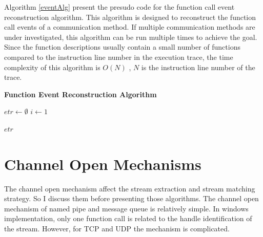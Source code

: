 Algorithm \ref{eventAlg} present the presudo code for the function call event reconstruction algorithm. This algorithm is designed to reconstruct the function call events of a communication method. If multiple communication methods are under investigated, this algorithm can be run multiple times to achieve the goal. Since the function descriptions usually contain a  small number of functions compared to the instruction line number in the execution trace, the time complexity of this algorithm is $O(N)$ , $N$ is the instruction line number of the trace.

\begin{algorithm}[H]
\DontPrintSemicolon
\caption{{\bf Function Event Reconstruction Algorithm} \label{eventAlg}}
\;
$etr \leftarrow \emptyset$\; 
$i \leftarrow 1$\;

\KwRet $etr$\;
\end{algorithm} 

\section{Channel Open Mechanisms}\label{mecha}
The channel open mechanism affect the stream extraction and stream matching strategy. So I discuss them before presenting those algorithms. The channel open mechanism of named pipe and message queue is relatively simple. In windows implementation, only one function call is related to the handle identification of the stream. However, for TCP and UDP the mechanism is complicated.

